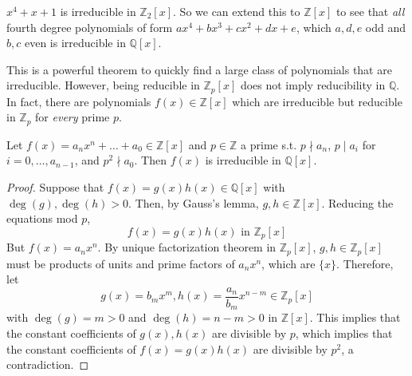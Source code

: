   \begin{example}
    $x^4 + x + 1$ is irreducible in $\mathbb{Z}_2 [x]$. So we can extend this to $\mathbb{Z}[x]$ to see that \textit{all} fourth degree polynomials of form $a x^4 + b x^3 + c x^2 + dx + e$, which $a, d, e$ odd and $b, c$ even is irreducible in $\mathbb{Q}[x]$. 
  \end{example}

  This is a powerful theorem to quickly find a large class of polynomials that are irreducible. However, being reducible in $\mathbb{Z}_p [x]$ does not imply reducibility in $\mathbb{Q}$. In fact, there are polynomials $f(x) \in \mathbb{Z}[x]$ which are irreducible but reducible in $\mathbb{Z}_p$ for \textit{every} prime $p$. 

  \begin{theorem}
    Let $f(x) = a_n x^n + \ldots + a_0 \in \mathbb{Z}[x]$ and $p \in \mathbb{Z}$ a prime s.t. $p \nmid a_n$, $p \mid a_i$ for $i = 0, \ldots, a_{n-1}$, and $p^2 \nmid a_0$. Then $f(x)$ is irreducible in $\mathbb{Q}[x]$. 
  \end{theorem}
  \begin{proof}
    Suppose that $f(x) = g(x) h(x) \in \mathbb{Q}[x]$ with $\deg(g), \deg(h) > 0$. Then, by Gauss's lemma, $g, h \in \mathbb{Z}[x]$. Reducing the equations mod $p$, 
    \begin{equation}
      f(x) = g(x) h(x) \text{ in } \mathbb{Z}_p [x]
    \end{equation}
    But $f(x) = a_n x^n$. By unique factorization theorem in $\mathbb{Z}_p [x]$, $g, h \in \mathbb{Z}_p [x]$ must be products of units and prime factors of $a_n x^n$, which are $\{x\}$. Therefore, let 
    \begin{equation}
      g(x) = b_m x^m, h(x) = \frac{a_n}{b_m} x^{n-m} \in \mathbb{Z}_p [x]
    \end{equation}
    with $\deg(g) = m > 0$ and $\deg(h) = n - m > 0$ in $\mathbb{Z}[x]$. This implies that the constant coefficients of $g(x), h(x)$ are divisible by $p$, which implies that the constant coefficients of $f(x) = g(x) h(x)$ are divisible by $p^2$, a contradiction. 
  \end{proof}

